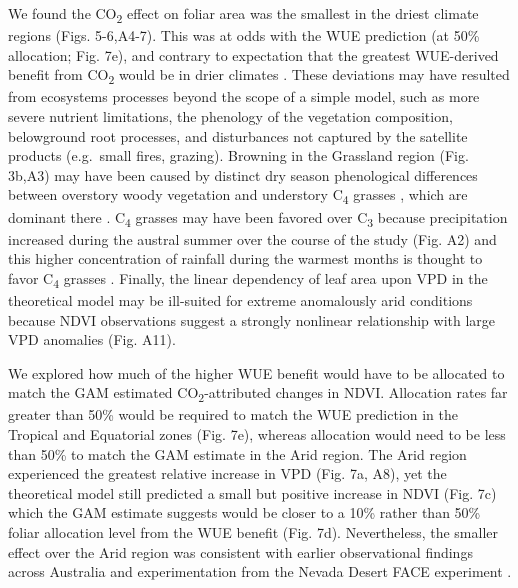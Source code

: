 \documentclass[gc, manuscript]{copernicus}
\begin{document}
We found the CO\textsubscript{2} effect on foliar area was the smallest
in the driest climate regions (Figs. 5-6,A4-7). This was at odds with
the WUE prediction (at 50\% allocation; Fig. 7e), and contrary to
expectation that the greatest WUE-derived benefit from
CO\textsubscript{2} would be in drier climates
\citep{donohue_etal17, mcmurtrieWhyPlantgrowthResponse2008}. These
deviations may have resulted from ecosystems processes beyond the scope
of a simple model, such as more severe nutrient limitations, the
phenology of the vegetation composition, belowground root processes, and
disturbances not captured by the satellite products (e.g.~small fires,
grazing). Browning in the Grassland region (Fig. 3b,A3) may have been
caused by distinct dry season phenological differences between overstory
woody vegetation and understory C\textsubscript{4} grasses
\citep{mooreReviewsSynthesesAustralian2016}, which are dominant there
\citep{murphySeasonalWaterAvailability2007}. C\textsubscript{4} grasses
may have been favored over C\textsubscript{3} because precipitation
increased during the austral summer over the course of the study (Fig.
A2) and this higher concentration of rainfall during the warmest months
is thought to favor C\textsubscript{4} grasses
\citep{hattersleyDistributionC3C41983a, knappResolvingDustBowl2020, murphySeasonalWaterAvailability2007}.
Finally, the linear dependency of leaf area upon VPD in the theoretical
model may be ill-suited for extreme anomalously arid conditions because
NDVI observations suggest a strongly nonlinear relationship with large
VPD anomalies (Fig. A11).

We explored how much of the higher WUE benefit would have to be
allocated to match the GAM estimated CO\textsubscript{2}-attributed
changes in NDVI. Allocation rates far greater than 50\% would be
required to match the WUE prediction in the Tropical and Equatorial
zones (Fig. 7e), whereas allocation would need to be less than 50\% to
match the GAM estimate in the Arid region. The Arid region experienced
the greatest relative increase in VPD (Fig. 7a, A8), yet the theoretical
model still predicted a small but positive increase in NDVI (Fig. 7c)
which the GAM estimate suggests would be closer to a 10\% rather than
50\% foliar allocation level from the WUE benefit (Fig. 7d).
Nevertheless, the smaller effect over the Arid region was consistent
with earlier observational findings across Australia
\citep{ukkolaReducedStreamflowWaterstressed2016b} and experimentation
from the Nevada Desert FACE experiment
\citep{smithLongtermResponseMojave2014}.
\end{document}
